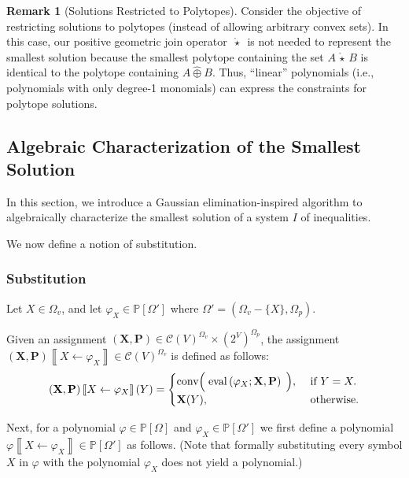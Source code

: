 \documentclass[10pt]{amsart}
\theoremstyle{plain}
\theoremstyle{definition}
\newtheorem{remark}[lemma]{Remark}
\providecommand{\cC}[0]{\ensuremath{\mathcal C}\xspace}
\providecommand{\bP}[0]{\ensuremath{\mathbf P}\xspace}
\providecommand{\bX}[0]{\ensuremath{\mathbf X}\xspace}
\providecommand{\cplus}[0]{\ensuremath{\hat{\oplus}}\xspace}
\providecommand{\cmult}[0]{\ensuremath{{\,\mathring{\star}\,}}\xspace}
\providecommand{\conv}[1]{\ensuremath{\mathrm{conv}{\left({#1}\right)}\xspace}}
\providecommand{\convset}[0]{\ensuremath{\cC}\xspace}
\providecommand{\evalmap}[0]{\ensuremath{\mathrm{eval}}\xspace}
\begin{document}
\begin{remark}[Solutions Restricted to Polytopes]
    Consider the objective of restricting solutions to polytopes (instead of allowing arbitrary convex sets). 
    In this case, our positive geometric join operator $\cmult$ is not needed to represent the smallest solution
        because the smallest polytope containing the set $A\cmult B$ is identical to the polytope containing $A\cplus B$. 
    Thus, ``linear'' polynomials (i.e., polynomials with only degree-1 monomials) can express the constraints for polytope solutions.  
\end{remark}




\subsection{Algebraic Characterization of the Smallest Solution}
\label{subsec:algebraic-solution}
In this section, we introduce a Gaussian elimination-inspired algorithm to algebraically characterize the smallest solution of a system $I$ of inequalities. 

We now define a notion of substitution.
\subsubsection{Substitution}
\label{subsubsec:algebraic-solution:prelim}
Let $X \in \Omega_v$, and let $\varphi_X \in \mathbb{P}[\Omega']$ 
where $\Omega' = (\Omega_v - \{X\}, \Omega_p)$.

Given an assignment $(\bX, \bP) \in \convset(V)^{\Omega_v} \times (2^V)^{\Omega_p}$, 
the assignment $(\bX,\bP)\left\llbracket X\gets \varphi_X\right\rrbracket \in\convset(V)^{\Omega_v}$ is defined as follows:
\begin{equation}
    (\bX,\bP)\left\llbracket X\gets \varphi_X\right\rrbracket(Y) = \begin{cases}
        \conv{\;\evalmap\left(\varphi_X ;\bX,\bP\right)\;\vphantom{2^{2^2}}}, &\text{ if } Y=X.\\
        \bX(Y),&\text{ otherwise.}
    \end{cases}
\end{equation}

Next, for a polynomial $\varphi \in \mathbb{P}[\Omega]$ and $\varphi_X \in \mathbb{P}[\Omega']$
we first define a polynomial $\varphi\left\llbracket X\gets \varphi_X\right\rrbracket \in \mathbb{P}[\Omega']$ as follows.
(Note that
formally substituting every symbol $X$ in $\varphi$ with the polynomial $\varphi_X$ does not yield a polynomial.) 
\end{document}

